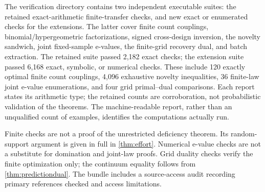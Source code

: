 \documentclass[11pt]{article}
\numberwithin{equation}{section}
\theoremstyle{definition}
\theoremstyle{remark}
\begin{document}
The verification directory contains two independent executable suites: the retained exact-arithmetic finite-transfer checks, and new exact or enumerated checks for the extensions. The latter cover finite count couplings, binomial/hypergeometric factorizations, signed cross-design inversion, the novelty sandwich, joint fixed-sample e-values, the finite-grid recovery dual, and batch extraction. The retained suite passed 2,182 exact checks; the extension suite passed 6,168 exact, symbolic, or numerical checks. These include 120 exactly optimal finite count couplings, 4,096 exhaustive novelty inequalities, 36 finite-law joint e-value enumerations, and four grid primal--dual comparisons. Each report states its arithmetic type; the retained counts are corroboration, not probabilistic validation of the theorems. The machine-readable report, rather than an unqualified count of examples, identifies the computations actually run.

Finite checks are not a proof of the unrestricted deficiency theorem. Its random-support argument is given in full in \cref{thm:effort}. Numerical e-value checks are not a substitute for domination and joint-law proofs. Grid duality checks verify the finite optimization only; the continuum equality follows from \cref{thm:predictiondual}. The bundle includes a source-access audit recording primary references checked and access limitations.
\end{document}
